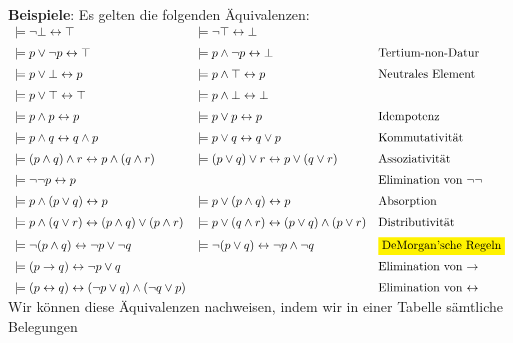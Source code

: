 \noindent
\textbf{Beispiele}:  Es gelten die folgenden \"{A}quivalenzen: \\[0.3cm]
\hspace*{0.3cm} 
$\begin{array}{lll}
\models \neg \falsum \leftrightarrow \verum & \models \neg \verum \leftrightarrow \falsum &  \\[0.2cm]
 \models p \vee   \neg p \leftrightarrow \verum & \models p \wedge \neg p \leftrightarrow \falsum & \mbox{Tertium-non-Datur} \\[0.2cm]
 \models p \vee   \falsum \leftrightarrow p & \models p \wedge \verum  \leftrightarrow p & \mbox{Neutrales Element}\\[0.2cm]
 \models p \vee   \verum  \leftrightarrow \verum & \models p \wedge \falsum \leftrightarrow \falsum &  \\[0.2cm]
 \models p \wedge p \leftrightarrow p  & \models p \vee p \leftrightarrow p &  \mbox{Idempotenz} \\[0.2cm]
 \models p \wedge q \leftrightarrow q \wedge p & \models p \vee   q \leftrightarrow q \vee p & \mbox{Kommutativit\"{a}t} \\[0.2cm]
 \models (p \wedge q) \wedge r \leftrightarrow p \wedge (q \wedge r) & \models (p \vee   q) \vee r \leftrightarrow p \vee   (q \vee r)  &
 \mbox{Assoziativit\"{a}t} \\[0.2cm]
 \models \neg \neg p \leftrightarrow p & & \mbox{Elimination von $\neg \neg$} \\[0.2cm]
 \models p \wedge (p \vee q)   \leftrightarrow p & \models p \vee   (p \wedge q) \leftrightarrow p &  \mbox{Absorption} \\[0.2cm]
 \models p \wedge (q \vee r)   \leftrightarrow (p \wedge q) \vee   (p \wedge r) & 
 \models p \vee   (q \wedge r) \leftrightarrow (p \vee q)   \wedge (p \vee   r) & \mbox{Distributivit\"{a}t} \\[0.2cm]
 \models \neg (p \wedge q) \leftrightarrow  \neg p \vee   \neg q &  \models \neg (p \vee   q) \leftrightarrow  \neg p \wedge \neg q &
 \mbox{\colorbox{yellow}{DeMorgan'sche Regeln}}  \\[0.2cm]
 \models (p \rightarrow q) \leftrightarrow \neg p \vee q & &  \mbox{Elimination von $\rightarrow$} \\[0.2cm]
 \models (p \leftrightarrow q) \leftrightarrow (\neg p \vee q) \wedge (\neg q \vee p) & & \mbox{Elimination von $\leftrightarrow$}
\end{array}$ \\[0.3cm]
Wir k\"{o}nnen diese \"{A}quivalenzen nachweisen, indem wir in einer Tabelle s\"{a}mtliche Belegungen
